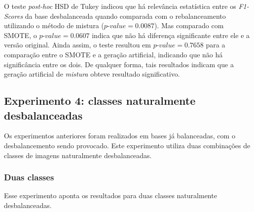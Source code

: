 
O teste \textit{post-hoc} HSD de Tukey indicou que há relevância estatística entre os \textit{F1-Scores} da base desbalanceada quando comparada com o rebalanceamento utilizando o método de mistura ($ \textit{p-value} = 0.0087$). Mas comparado com SMOTE, o $\textit{p-value} = 0.0607$ indica que não há diferença significante entre ele e a versão original. Ainda assim, o teste resultou em $\textit{p-value} = 0.7658$ para a comparação entre o SMOTE e a geração artificial, indicando que não há significância entre os dois. De qualquer forma, tais resultados indicam que a geração artificial de \emph{mistura} obteve resultado significativo.


\FloatBarrier
\subsection{Experimento 4: classes naturalmente desbalanceadas}

Os experimentos anteriores foram realizados em bases já balanceadas, com o desbalancemento sendo provocado. Este experimento utiliza duas combinações de classes de imagens naturalmente desbalanceadas.


\subsubsection{Duas classes}

Esse experimento aponta os resultados para duas classes naturalmente desbalanceadas.


